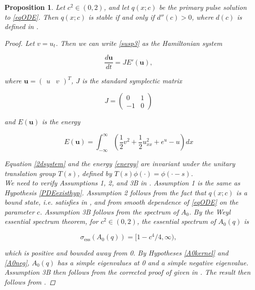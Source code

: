 \documentclass[12pt]{article}
\newtheorem{proposition}{Proposition}
\begin{document}
\begin{proposition}\label{qstable}
Let $c^2 \in (0, 2)$, and let $q(x; c)$ be the primary pulse solution to \eqref{eqODE}. Then $q(x; c)$ is stable if and only if $d''(c) > 0$, where $d(c)$ is defined in \cite[equation (2.16)]{Grillakis1987}.

\begin{proof}
Let $v = u_t$. Then we can write \eqref{susp3} as the Hamiltonian system

\begin{equation}\label{2dsystem}
\frac{d \textbf{u} }{dt} = J E'(\textbf{u}),
\end{equation}

where $\textbf{u} = \begin{pmatrix}u&v\end{pmatrix}^T$, $J$ is the standard symplectic matrix

\begin{equation*}
J = \begin{pmatrix}0 & 1 \\ -1 & 0 \end{pmatrix}
\end{equation*}

and $E(\textbf{u})$ is the energy

\begin{equation}\label{energy}
E(\textbf{u}) = \int_{-\infty}^\infty \left(\frac{1}{2} v^2 + \frac{1}{2}u_{xx}^2 + e^{u} - u \right)dx
\end{equation}

Equation \eqref{2dsystem} and the energy \eqref{energy} are invariant under the unitary translation group $T(s)$, defined by $T(s)\phi(\cdot) = \phi(\cdot - s)$. \\

We need to verify Assumptions 1, 2, and 3B in \cite{Grillakis1987}. Assumption 1 is the same as Hypothesis \ref{PDEexisthyp}. Assumption 2 follows from the fact that $q(x; c)$ is a bound state, i.e. satisfies in \cite[equation (2.15)]{Grillakis1987}, and from smooth dependence of \eqref{eqODE} on the parameter $c$. Assumption 3B follows from the spectrum of $A_0$. By the Weyl essential spectrum theorem, for $c^2 \in (0, 2)$, the essential spectrum of $A_0(q)$ is 

\begin{equation}\label{A0ess}
\sigma_{\text{ess}}(A_0(q)) = [1 - c^4/4, \infty),
\end{equation}

which is positive and bounded away from 0. By Hypotheses \ref{A0kernel} and \ref{A0neg}, $A_0(q)$ has a simple eigenvalues at 0 and a simple negative eigenvalue. Assumption 3B then follows from the corrected proof of \cite[Lemma 6.2]{Grillakis1987} given in \cite{Grillakis1990}. The result then follows from \cite[Theorem 5.5 and 3]{Grillakis1987}.
\end{proof}
\end{proposition}
\end{document}
